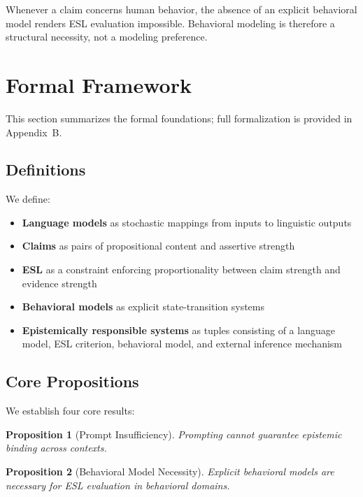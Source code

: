 \documentclass[11pt,a4paper]{article}
\newtheorem{proposition}{Proposition}[section]
\begin{document}
Whenever a claim concerns human behavior, the absence of an explicit behavioral model renders ESL evaluation impossible. Behavioral modeling is therefore a structural necessity, not a modeling preference.


\section{Formal Framework}

This section summarizes the formal foundations; full formalization is provided in Appendix~B.

\subsection{Definitions}

We define:
\begin{itemize}
    \item \textbf{Language models} as stochastic mappings from inputs to linguistic outputs
    \item \textbf{Claims} as pairs of propositional content and assertive strength
    \item \textbf{ESL} as a constraint enforcing proportionality between claim strength and evidence strength
    \item \textbf{Behavioral models} as explicit state-transition systems
    \item \textbf{Epistemically responsible systems} as tuples consisting of a language model, ESL criterion, behavioral model, and external inference mechanism
\end{itemize}

\subsection{Core Propositions}

We establish four core results:

\begin{proposition}[Prompt Insufficiency]
Prompting cannot guarantee epistemic binding across contexts.
\end{proposition}

\begin{proposition}[Behavioral Model Necessity]
Explicit behavioral models are necessary for ESL evaluation in behavioral domains.
\end{proposition}
\end{document}
